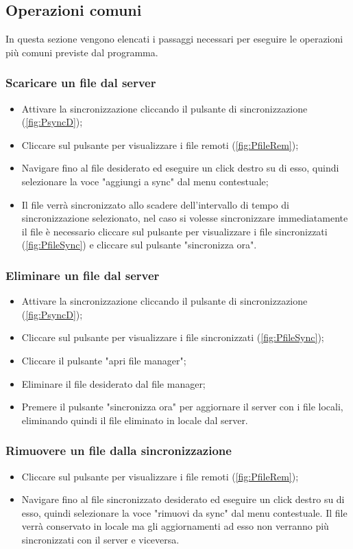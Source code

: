 \subsection{Operazioni comuni}
In questa sezione vengono elencati i passaggi necessari per eseguire le operazioni più comuni previste dal programma.
\subsubsection{Scaricare un file dal server}
\begin{itemize}
\item Attivare la sincronizzazione cliccando il pulsante di sincronizzazione (\ref{fig:PsyncD});
\item Cliccare sul pulsante per visualizzare i file remoti (\ref{fig:PfileRem});
\item Navigare fino al file desiderato ed eseguire un click destro su di esso, quindi selezionare la voce "aggiungi a sync" dal menu contestuale;
\item Il file verrà sincronizzato allo scadere dell'intervallo di tempo di sincronizzazione selezionato, nel caso si volesse sincronizzare immediatamente il file è necessario cliccare sul pulsante per visualizzare i file sincronizzati (\ref{fig:PfileSync}) e cliccare sul pulsante "sincronizza ora".
\end{itemize}
\subsubsection{Eliminare un file dal server}
\begin{itemize}
\item Attivare la sincronizzazione cliccando il pulsante di sincronizzazione (\ref{fig:PsyncD});
\item Cliccare sul pulsante per visualizzare i file sincronizzati (\ref{fig:PfileSync});
\item Cliccare il pulsante "apri file manager";
\item Eliminare il file desiderato dal file manager;
\item Premere il pulsante "sincronizza ora" per aggiornare il server con i file locali, eliminando quindi il file eliminato in locale dal server.
\end{itemize}
\subsubsection{Rimuovere un file dalla sincronizzazione}
\begin{itemize}
\item Cliccare sul pulsante per visualizzare i file remoti (\ref{fig:PfileRem});
\item Navigare fino al file sincronizzato desiderato ed eseguire un click destro su di esso, quindi selezionare la voce "rimuovi da sync" dal menu contestuale. Il file verrà conservato in locale ma gli aggiornamenti ad esso non verranno più sincronizzati con il server e viceversa.
\end{itemize}

